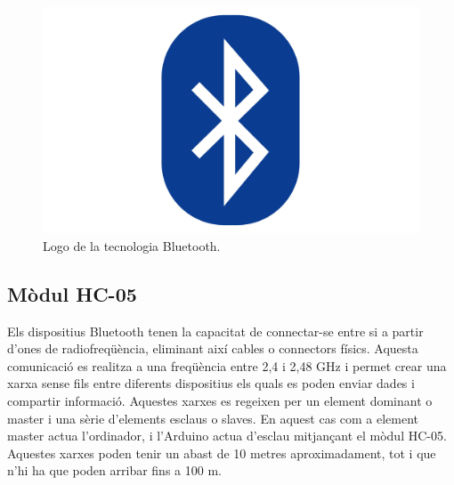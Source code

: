 \begin{figure}[H]
	\centering
	\includegraphics[scale=0.03]{BluetoothLogo}
	\caption{Logo de la tecnologia Bluetooth.}
	\label{fig:BTlogo}
\end{figure}

\subsection{Mòdul HC-05}

Els dispositius Bluetooth tenen la capacitat de connectar-se entre si a partir d’ones de radiofreqüència, eliminant així cables o connectors físics. Aquesta comunicació es realitza a una freqüència entre 2,4 i 2,48 GHz i permet crear una xarxa sense fils entre diferents dispositius els quals es poden enviar dades i compartir informació. Aquestes xarxes es regeixen per un element dominant o master i una sèrie d’elements esclaus o slaves. En aquest cas com a  element master actua l’ordinador, i l’Arduino actua d’esclau mitjançant el mòdul HC-05. Aquestes xarxes poden tenir un abast de 10 metres aproximadament, tot i que n’hi ha que poden arribar fins a 100 m. 

